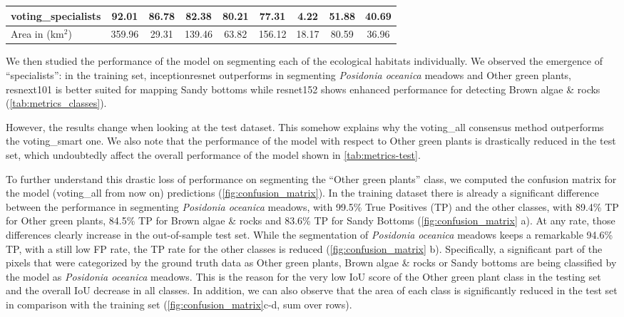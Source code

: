 \begin{table}[H]
\begin{tabular}{lcccc|cccc}
        \\
        voting\_specialists & 92.01                                & 86.78
                            & 82.38                                & 80.21
                            & \textbf{77.31}                       &
        4.22                & 51.88                                & 40.69

        \\
        \bottomrule
        Area in (km$^2$)    & 359.96                               & 29.31
                            & 139.46                               & 63.82
                            & 156.12                               & 18.17
                            &
        80.59               & 36.96

        \\
    \end{tabular}
\end{table}

We then studied the performance of the model on segmenting each of the
ecological habitats individually. We observed the emergence of ``specialists'':
in the training set, inceptionresnet outperforms in segmenting
\textit{Posidonia oceanica} meadows and Other green plants, resnext101 is
better suited for mapping Sandy bottoms while resnet152 shows enhanced
performance for detecting Brown algae \& rocks (\cref{tab:metrics_classes}).

However, the results change when looking at the test dataset. This somehow
explains why the voting\_all consensus method outperforms the voting\_smart
one. We also note that the performance of the model with respect to Other green
plants is drastically reduced in the test set, which undoubtedly affect the
overall performance of the model shown in \cref{tab:metrics-test}.

To further understand this drastic loss of performance on segmenting the
``Other green plants'' class, we computed the confusion matrix for the model
(voting\_all from now on) predictions (\cref{fig:confusion_matrix}). In the
training dataset there is already a significant difference between the
performance in segmenting \textit{Posidonia oceanica} meadows, with 99.5\% True
Positives (TP) and the other classes, with 89.4\% TP for Other green plants,
84.5\% TP for Brown algae \& rocks and 83.6\% TP for Sandy Bottoms
(\cref{fig:confusion_matrix} a). At any rate, those differences clearly
increase in the out-of-sample test set. While the segmentation of
\textit{Posidonia oceanica} meadows keeps a remarkable 94.6\% TP, with a still
low FP rate, the TP rate for the other classes is reduced
(\cref{fig:confusion_matrix} b). Specifically, a significant part of the pixels
that were categorized by the ground truth data as Other green plants, Brown
algae \& rocks or Sandy bottoms are being classified by the model as
\textit{Posidonia oceanica} meadows. This is the reason for the very low IoU
score of the Other green plant class in the testing set and the overall IoU
decrease in all classes. In addition, we can also observe that the area of each
class is significantly reduced in the test set in comparison with the training
set (\cref{fig:confusion_matrix}c-d, sum over rows).

